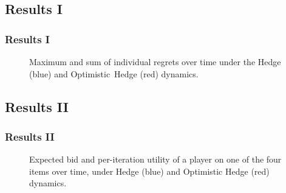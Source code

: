 \documentclass{beamer}
\begin{document}
\subsection{Results I}
\begin{frame}
	\frametitle{Results I}
	\begin{figure}[!t]
		\centering
		\quad
		\caption{Maximum and sum of individual regrets over time under the
			Hedge (blue) and \mbox{Optimistic Hedge} (red) dynamics.}\label{fig:regrets}
	\end{figure}
\end{frame}

\subsection{Results II}
\begin{frame}
	\frametitle{Results II}
	\begin{figure}[!t]
		\centering
		\quad
		\caption{Expected bid and per-iteration utility of a player on one of
			the four items over time, under Hedge (blue) and {Optimistic Hedge}
			(red) dynamics.}\label{fig:bids}
	\end{figure}
\end{frame}
\end{document}
